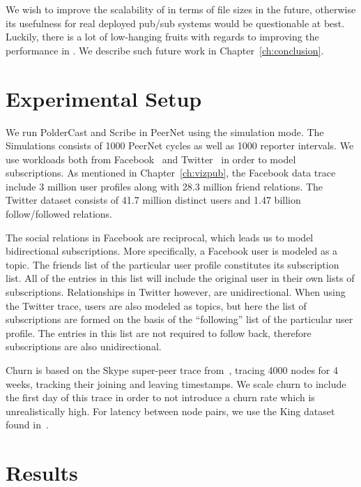 We wish to improve the scalability of \demo{} in terms of file sizes in
the future, otherwise its usefulness for real deployed pub/sub systems
would be questionable at best. Luckily, there is a lot of low-hanging
fruits with regards to improving the performance in \demo{}. We describe
such future work in Chapter~\ref{ch:conclusion}.

\section{Experimental Setup}

We run PolderCast and Scribe in PeerNet using the simulation mode. The
Simulations consists of 1000 PeerNet cycles as well as 1000 reporter
intervals. We use workloads both from Facebook~\cite{facebook-eurosys09} and
Twitter~\cite{Kwak10www} in order to model subscriptions. As mentioned in
Chapter~\ref{ch:vizpub}, the Facebook data trace include 3 million user
profiles along with 28.3 million friend relations. The Twitter dataset
consists of 41.7 million distinct users and 1.47 billion
follow/followed relations.

The social relations in Facebook are reciprocal, which leads us to model
bidirectional subscriptions. More specifically, a Facebook user is
modeled as a topic. The friends list of the particular user profile
constitutes its subscription list. All of the entries in this list will
include the original user in their own lists of subscriptions.
Relationships in Twitter however, are unidirectional. When using the
Twitter trace, users are also modeled as topics, but here the list of
subscriptions are formed on the basis of the ``following'' list of the
particular  user profile. The entries in this list are not required to
follow back, therefore subscriptions are also unidirectional.

Churn is based on the Skype super-peer trace from~\cite{Guha:2006}, tracing 4000
nodes for 4 weeks, tracking their joining and leaving timestamps. We
scale churn to include the first day of this trace in order to not
introduce a churn rate which is unrealistically high. For latency
between node pairs, we use the King dataset found in~\cite{king}.

\section{Results}


